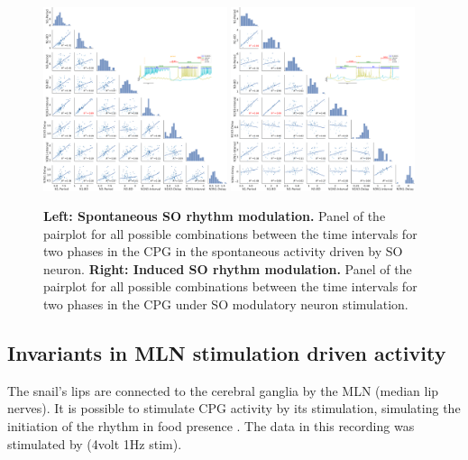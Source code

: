  
\begin{figure}[htbp]
	\centering
	\includegraphics[width=0.48\textwidth]{./invariants/data/SUSSEX/prep4_so_driven_2/images/panel_with_pairplot.pdf}
	\includegraphics[width=0.48\textwidth]{./invariants/data/SUSSEX/SO_driven/images/panel_with_pairplot.pdf}
	\caption{\textbf{Left: Spontaneous SO rhythm modulation.} Panel of the pairplot for all possible combinations between the time intervals for two phases in the CPG in the spontaneous activity driven by SO neuron. \textbf{Right: Induced SO rhythm modulation.} Panel of the pairplot for all possible combinations between the time intervals for two phases in the CPG under SO modulatory neuron stimulation.}
	\label{fig:so pairplot comparison}
\end{figure}

\subsection{Invariants in MLN stimulation driven activity}
The snail's lips are connected to the cerebral ganglia by the MLN (median lip nerves). It is possible to stimulate CPG activity by its stimulation, simulating the initiation of the rhythm in food presence \parencite{staras_electrophysiological_2019}. The data in this recording was stimulated by (4volt 1Hz stim).


